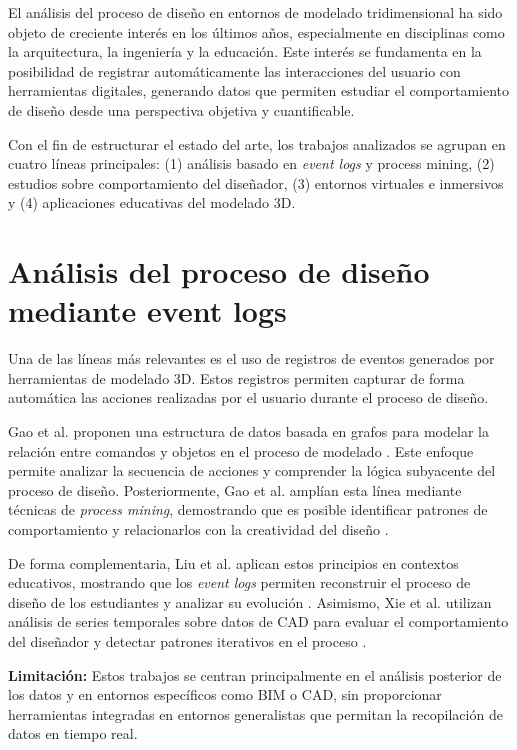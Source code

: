 
El análisis del proceso de diseño en entornos de modelado tridimensional ha sido objeto de creciente interés en los últimos años, especialmente en disciplinas como la arquitectura, la ingeniería y la educación. Este interés se fundamenta en la posibilidad de registrar automáticamente las interacciones del usuario con herramientas digitales, generando datos que permiten estudiar el comportamiento de diseño desde una perspectiva objetiva y cuantificable.

Con el fin de estructurar el estado del arte, los trabajos analizados se agrupan en cuatro líneas principales: (1) análisis basado en \textit{event logs} y process mining, (2) estudios sobre comportamiento del diseñador, (3) entornos virtuales e inmersivos y (4) aplicaciones educativas del modelado 3D.

\section{Análisis del proceso de diseño mediante event logs}

Una de las líneas más relevantes es el uso de registros de eventos generados por herramientas de modelado 3D. Estos registros permiten capturar de forma automática las acciones realizadas por el usuario durante el proceso de diseño.

Gao et al. proponen una estructura de datos basada en grafos para modelar la relación entre comandos y objetos en el proceso de modelado \cite{gao2021}. Este enfoque permite analizar la secuencia de acciones y comprender la lógica subyacente del proceso de diseño. Posteriormente, Gao et al. amplían esta línea mediante técnicas de \textit{process mining}, demostrando que es posible identificar patrones de comportamiento y relacionarlos con la creatividad del diseño \cite{gao2023}.

De forma complementaria, Liu et al. aplican estos principios en contextos educativos, mostrando que los \textit{event logs} permiten reconstruir el proceso de diseño de los estudiantes y analizar su evolución \cite{liu2022}. Asimismo, Xie et al. utilizan análisis de series temporales sobre datos de CAD para evaluar el comportamiento del diseñador y detectar patrones iterativos en el proceso \cite{xie2014}.

\textbf{Limitación:} Estos trabajos se centran principalmente en el análisis posterior de los datos y en entornos específicos como BIM o CAD, sin proporcionar herramientas integradas en entornos generalistas que permitan la recopilación de datos en tiempo real.

